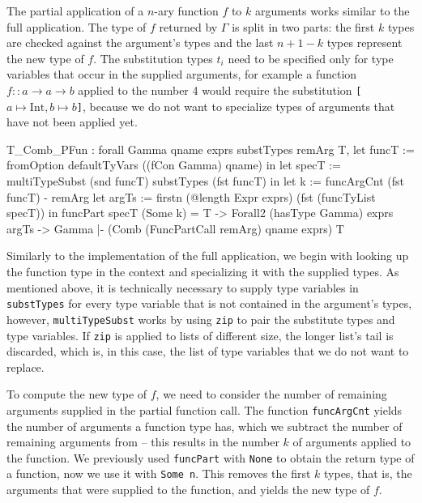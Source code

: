 \documentclass[paper = a4, fleqn, abstract=on, twoside]{scrreprt}
\newcommand{\coqinline}[1]{\texttt{#1}}
\begin{document}
\noindent
The partial application of a $n$-ary function $f$ to $k$ arguments works similar to the full application. The type of $f$ returned by $\Gamma$ is split in two parts: the first $k$ types are checked against the argument's types and the last $n + 1 - k$ types represent the new type of $f$. The substitution types $t_{i}$ need to be specified only for type variables that occur in the supplied arguments, for example a function $f :: a \rightarrow a \rightarrow b$ applied to the number 4 would require the substitution \texttt{[$a \mapsto \text{Int}, b \mapsto b$]}, because we do not want to specialize types of arguments that have not been applied yet.
\begin{coqcode}
T_Comb_PFun : forall Gamma qname exprs substTypes remArg T,
                let funcT := fromOption defaultTyVars ((fCon Gamma) qname) in
                let specT := multiTypeSubst (snd funcT) substTypes (fst funcT) in
                let     k := funcArgCnt (fst funcT) - remArg
                let argTs := firstn (@length Expr exprs) (fst (funcTyList specT))
                 in funcPart specT (Some k) = T ->
                    Forall2 (hasType Gamma) exprs argTs ->
              Gamma |- (Comb (FuncPartCall remArg) qname exprs) \in T
\end{coqcode}
Similarly to the implementation of the full application, we begin with looking up the function type in the context and specializing it with the supplied types. As mentioned above, it is technically necessary to supply type variables in \coqinline{substTypes} for every type variable that is not contained in the argument's types, however, \coqinline{multiTypeSubst} works by using \coqinline{zip} to pair the substitute types and type variables. If \coqinline{zip} is applied to lists of different size, the longer list's tail is discarded, which is, in this case, the list of type variables that we do not want to replace.
\par
To compute the new type of $f$, we need to consider the number of remaining arguments supplied in the partial function call. The function \coqinline{funcArgCnt} yields the number of arguments a function type has, which we subtract the number of remaining arguments from -- this results in the number $k$ of arguments applied to the function. We previously used \coqinline{funcPart} with \coqinline{None} to obtain the return type of a function, now we use it with \coqinline{Some n}. This removes the first $k$ types, that is, the arguments that were supplied to the function, and yields the new type of $f$.
\par
\end{document}
